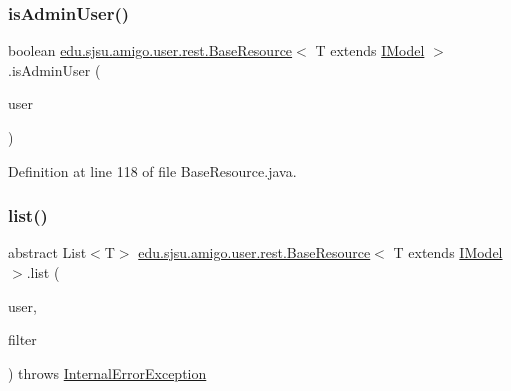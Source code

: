 \subsubsection{\texorpdfstring{is\+Admin\+User()}{isAdminUser()}}
{\footnotesize\ttfamily boolean \hyperlink{classedu_1_1sjsu_1_1amigo_1_1user_1_1rest_1_1_base_resource}{edu.\+sjsu.\+amigo.\+user.\+rest.\+Base\+Resource}$<$ T extends \hyperlink{interfaceedu_1_1sjsu_1_1amigo_1_1db_1_1common_1_1model_1_1_i_model}{I\+Model} $>$.is\+Admin\+User (\begin{DoxyParamCaption}\item[{@Auth \hyperlink{classedu_1_1sjsu_1_1amigo_1_1user_1_1auth_1_1_principal_user}{Principal\+User}}]{user }\end{DoxyParamCaption})\hspace{0.3cm}{\ttfamily [protected]}}



Definition at line 118 of file Base\+Resource.\+java.

\mbox{\label{classedu_1_1sjsu_1_1amigo_1_1user_1_1rest_1_1_base_resource_a0a2b1ac87302d4791b11a52f39aa5803}} 
\subsubsection{\texorpdfstring{list()}{list()}}
{\footnotesize\ttfamily abstract List$<$T$>$ \hyperlink{classedu_1_1sjsu_1_1amigo_1_1user_1_1rest_1_1_base_resource}{edu.\+sjsu.\+amigo.\+user.\+rest.\+Base\+Resource}$<$ T extends \hyperlink{interfaceedu_1_1sjsu_1_1amigo_1_1db_1_1common_1_1model_1_1_i_model}{I\+Model} $>$.list (\begin{DoxyParamCaption}\item[{@Auth \hyperlink{classedu_1_1sjsu_1_1amigo_1_1user_1_1auth_1_1_principal_user}{Principal\+User}}]{user,  }\item[{@Query\+Param(\char`\"{}filter\char`\"{}) String}]{filter }\end{DoxyParamCaption}) throws \hyperlink{classedu_1_1sjsu_1_1amigo_1_1user_1_1rest_1_1_internal_error_exception}{Internal\+Error\+Exception}\hspace{0.3cm}{\ttfamily [abstract]}}

